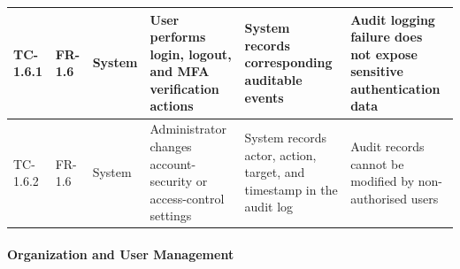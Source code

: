 \begin{longtable}{|>{\centering\arraybackslash}m{}|>{\centering\arraybackslash}m{}|>{\centering\arraybackslash}m{}|m{}|m{}|m{}|}
TC-1.6.1 & FR-1.6 & System & User performs login, logout, and MFA verification actions & System records corresponding auditable events & Audit logging failure does not expose sensitive authentication data \\ \hline
TC-1.6.2 & FR-1.6 & System & Administrator changes account-security or access-control settings & System records actor, action, target, and timestamp in the audit log & Audit records cannot be modified by non-authorised users \\ \hline

\end{longtable}


\paragraph{Organization and User Management}

